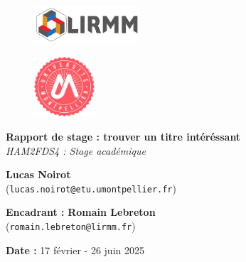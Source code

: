 \documentclass[a4paper,12pt]{report}  %
\theoremstyle{definitionstyle}
\theoremstyle{examplestyle}
\begin{document}
\begin{titlepage}
    \begin{center}
        \begin{figure}[t]
            \centering
            \includegraphics[width=0.35\textwidth]{logo/logo_LIRMM.jpg} 
        \end{figure}
        \begin{figure}[t]
            \centering
            \includegraphics[width=0.2\textwidth]{logo/logo_univ_mpt.png} 
        \end{figure}

        \vspace{2cm}
        \Huge{\textbf{Rapport de stage : trouver un titre intéréssant}} \\
        \vspace{0.5cm}
        \large{\textit{HAM2FDS4 : Stage académique}} \\
        
        \vspace{2cm}

        \large{
            \textbf{Lucas Noirot} \\
            (\texttt{lucas.noirot@etu.umontpellier.fr})
        }
        
        \vspace{1.5cm}
        
        \large{
            \textbf{Encadrant :} \textbf{Romain Lebreton} \\
            (\texttt{romain.lebreton@lirmm.fr})
        }

        \vspace{2cm}
        
        \normalsize{
            \textbf{Date :}  17 février - 26 juin 2025
        }
    \end{center}
\end{titlepage}
\end{document}
